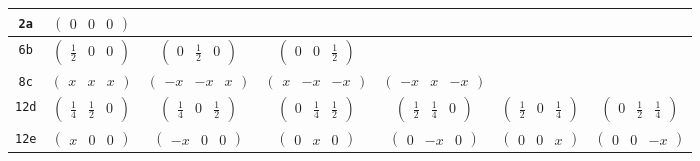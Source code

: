 \documentclass[fleqn,9pt,landscape]{jsarticle}
\begin{document}
\begin{center}
\begin{longtable}{ccccccc}
{\tt 2a} & $ \begin{pmatrix} 0 & 0 & 0 \end{pmatrix} $ & $  $ & $  $ & $  $ & $  $ & $  $ \\ \hline
{\tt 6b} & $ \begin{pmatrix} \frac{1}{2} & 0 & 0 \end{pmatrix} $ & $ \begin{pmatrix} 0 & \frac{1}{2} & 0 \end{pmatrix} $ & $ \begin{pmatrix} 0 & 0 & \frac{1}{2} \end{pmatrix} $ & $  $ & $  $ & $  $ \\ \hline
{\tt 8c} & $ \begin{pmatrix} x & x & x \end{pmatrix} $ & $ \begin{pmatrix} - x & - x & x \end{pmatrix} $ & $ \begin{pmatrix} x & - x & - x \end{pmatrix} $ & $ \begin{pmatrix} - x & x & - x \end{pmatrix} $ & $  $ & $  $ \\ \hline
{\tt 12d} & $ \begin{pmatrix} \frac{1}{4} & \frac{1}{2} & 0 \end{pmatrix} $ & $ \begin{pmatrix} \frac{1}{4} & 0 & \frac{1}{2} \end{pmatrix} $ & $ \begin{pmatrix} 0 & \frac{1}{4} & \frac{1}{2} \end{pmatrix} $ & $ \begin{pmatrix} \frac{1}{2} & \frac{1}{4} & 0 \end{pmatrix} $ & $ \begin{pmatrix} \frac{1}{2} & 0 & \frac{1}{4} \end{pmatrix} $ & $ \begin{pmatrix} 0 & \frac{1}{2} & \frac{1}{4} \end{pmatrix} $ \\ \hline
{\tt 12e} & $ \begin{pmatrix} x & 0 & 0 \end{pmatrix} $ & $ \begin{pmatrix} - x & 0 & 0 \end{pmatrix} $ & $ \begin{pmatrix} 0 & x & 0 \end{pmatrix} $ & $ \begin{pmatrix} 0 & - x & 0 \end{pmatrix} $ & $ \begin{pmatrix} 0 & 0 & x \end{pmatrix} $ & $ \begin{pmatrix} 0 & 0 & - x \end{pmatrix} $ \\ \hline

\end{longtable}
\end{center}
\end{document}
